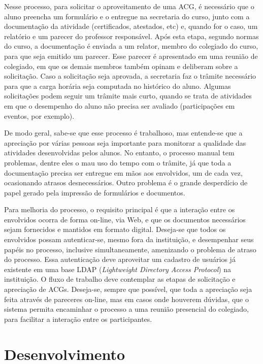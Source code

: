 \documentclass[12pt]{article}
\begin{document}
Nesse processo, para solicitar o aproveitamento de uma ACG, é necessário que o aluno preencha um formulário e o entregue na secretaria do curso, junto com a documentação da atividade (certificados, atestados, etc) e, quando for o caso, um relatório e um parecer do professor responsável. Após  esta  etapa,  segundo normas do curso, a documentação é enviada a um relator, membro do colegiado do curso, para que seja emitido um parecer. Esse parecer é apresentado em uma reunião de colegiado, em que os demais membros também opinam e deliberam sobre a solicitação. Caso a solicitação seja  aprovada, a secretaria faz o trâmite necessário para que a carga horária seja computada no histórico do aluno. Algumas solicitações podem seguir um trâmite mais curto, quando se trata de atividades em que o desempenho do aluno não precisa ser avaliado (participações em eventos, por exemplo). 

De modo geral, sabe-se que esse processo é trabalhoso, mas entende-se que a apreciação por várias pessoas seja importante para monitorar a qualidade das atividades desenvolvidas pelos alunos. No entanto, o processo manual tem problemas, dentre eles o mau uso do tempo com o trâmite, já que toda a documentação precisa ser entregue em mãos aos envolvidos, um de cada vez, ocasionando atrasos desnecessários. Outro problema é o grande desperdício de papel gerado pela impressão de formulários e documentos.

Para melhoria do processo, o requisito principal é que a interação entre os envolvidos ocorra de forma on-line, via Web, e que os documentos necessários sejam fornecidos e mantidos em formato digital. Deseja-se que todos os envolvidos possam autenticar-se, mesmo fora da instituição, e desempenhar seus papéis no processo, inclusive simultaneamente, amenizando o problema de atraso do processo. Essa autenticação deve aproveitar um cadastro de usuários já existente em uma base LDAP (\emph{Lightweight Directory Access Protocol}) na instituição. O fluxo de trabalho deve contemplar as etapas de solicitação e apreciação de ACGs. Deseja-se, sempre que possível, que toda a apreciação seja feita através de pareceres on-line, mas em casos onde houverem dúvidas, que o sistema permita encaminhar o processo a uma reunião presencial do colegiado, para facilitar a interação entre os participantes.

\section{Desenvolvimento}
\end{document}
